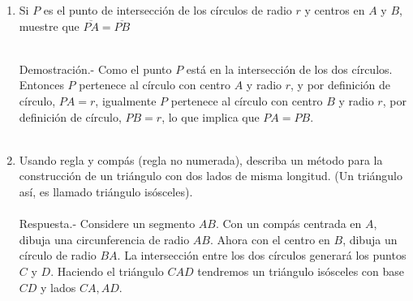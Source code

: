 \begin{enumerate}
\begin{enumerate}[\bfseries a)]
    \end{enumerate}

    \item Si $P$ es el punto de intersección de los círculos de radio $r$ y centros en $A$ y $B$, muestre que $\overline{PA}=\overline{PB}$\\\\
    \begin{center}
    \end{center}
    Demostración.-\; Como el punto $P$ está en la intersección de los dos círculos. Entonces $P$ pertenece al círculo con centro $A$ y radio $r$, y por definición de círculo, $PA = r$, igualmente $P$ pertenece al círculo con centro $B$ y radio $r$, por definición de círculo, $PB = r$, lo que implica que $PA = PB$.\\\\

    \item Usando regla y compás (regla no numerada), describa un método para la construcción de un triángulo con dos lados de misma longitud. (Un triángulo así, es llamado triángulo isósceles).\\\\
    Respuesta.-\; Considere un segmento $AB$. Con un compás centrada en $A$, dibuja una circunferencia de radio $AB$. Ahora con el centro en $B$, dibuja un círculo de radio $BA$. La intersección entre los dos círculos generará los puntos $C$ y $D$. Haciendo el triángulo $CAD$ tendremos un triángulo isósceles con base $CD$ y lados $CA,AD$.
    \begin{center}
\end{center}
\end{enumerate}
